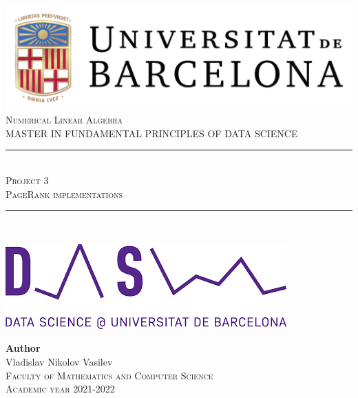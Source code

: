 \documentclass[11pt,a4paper]{article}
\newcommand{\subject}{Numerical Linear Algebra}
\newcommand{\autor}{Vladislav Nikolov Vasilev}
\newcommand{\titulo}{Project 3}
\newcommand{\subtitulo}{PageRank implementations}
\newcommand{\masters}{Master in Fundamental Principles of Data Science}
\begin{document}

\begin{titlepage}
  \begin{minipage}{\textwidth}
    \centering
    \includegraphics[scale=0.25]{img/ub-logo}\\[2cm]
    
    \textsc{\Large \subject\\[0.5cm]}
    \textsc{\uppercase\expandafter{\masters}}\\[1.5cm]
    
    \noindent\rule[-1ex]{\textwidth}{1pt}\\[1.5ex]
    \textsc{{\Huge \titulo\\[0.5ex]}}
    \textsc{{\Large \subtitulo\\}}
    \noindent\rule[-1ex]{\textwidth}{2pt}\\[3.5ex]
  \end{minipage}
  
  \vspace{2cm}
  
  \begin{minipage}{\textwidth}
    \centering
    
    \includegraphics[scale=0.4]{img/ub-ds-logo}
    \vspace{2cm}
    
    \textbf{Author}\\ {\autor{}}\\[2.5ex]
    \textsc{Faculty of Mathematics and Computer Science}\\
    \vspace{1em}
    \textsc{Academic year 2021-2022}
  \end{minipage}
\end{titlepage}
\end{document}
